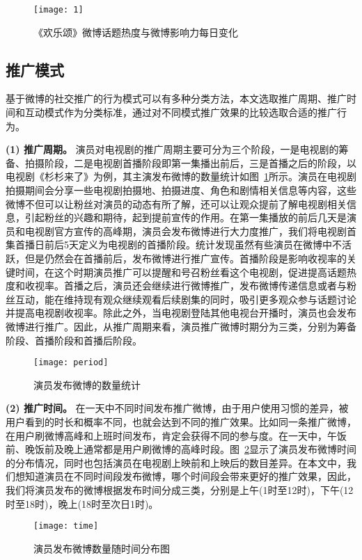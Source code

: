 \begin{figure}[!htbp]
\centering
\texttt{[image: 1]}
\caption{《欢乐颂》微博话题热度与微博影响力每日变化}
\end{figure}

\subsection{推广模式}

基于微博的社交推广的行为模式可以有多种分类方法，本文选取推广周期、推广时间和互动模式作为分类标准，通过对不同模式推广效果的比较选取合适的推广行为。

\textbf{(1) 推广周期。}
演员对电视剧的推广周期主要可分为三个阶段，一是电视剧的筹备、拍摄阶段，二是电视剧首播阶段即第一集播出前后，三是首播之后的阶段，以电视剧《杉杉来了》为例，其主演发布微博的数量统计如图~\ref{shan}所示。演员在电视剧拍摄期间会分享一些电视剧拍摄地、拍摄进度、角色和剧情相关信息等内容，这些微博不但可以让粉丝对演员的动态有所了解，还可以让观众提前了解电视剧相关信息，引起粉丝的兴趣和期待，起到提前宣传的作用。在第一集播放的前后几天是演员和电视剧官方宣传的高峰期，演员会发布微博进行大力度推广，我们将电视剧首集首播日前后5天定义为电视剧的首播阶段。统计发现虽然有些演员在微博中不活跃，但是仍然会在首播前后，发布微博进行推广宣传。首播阶段是影响收视率的关键时间，在这个时期演员推广可以提醒和号召粉丝看这个电视剧，促进提高话题热度和收视率。首播之后，演员还会继续进行微博推广，发布微博传递信息或者与粉丝互动，能在维持现有观众继续观看后续剧集的同时，吸引更多观众参与话题讨论并提高电视剧收视率。除此之外，当电视剧登陆其他电视台开播时，演员也会发布微博进行推广。因此，从推广周期来看，演员推广微博时期分为三类，分别为筹备阶段、首播阶段和首播后阶段。

\begin{figure}[!htp]
\centering
\texttt{[image: period]}
\caption{演员发布微博的数量统计}
\label{shan}
\end{figure}

\textbf{(2) 推广时间。}
在一天中不同时间发布推广微博，由于用户使用习惯的差异，被用户看到的时长和概率不同，也就会达到不同的推广效果。比如同一条推广微博，在用户刷微博高峰和上班时间发布，肯定会获得不同的参与度。在一天中，午饭前、晚饭前及晚上通常都是用户刷微博的高峰时段。图~\ref{time}显示了演员发布微博时间的分布情况，同时也包括演员在电视剧上映前和上映后的数目差异。在本文中，我们想知道演员在不同时间段发布微博，哪个时间段会带来更好的推广效果，因此，我们将演员发布的微博根据发布时间分成三类，分别是上午(1时至12时)，下午(12时至18时)，晚上(18时至次日1时)。

\begin{figure}[!htbp]
\centering
\texttt{[image: time]}
\caption{演员发布微博数量随时间分布图}
\label{time}
\end{figure}

